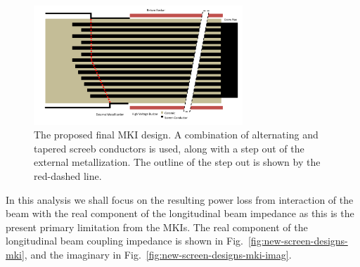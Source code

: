 \begin{figure}
\begin{center}
\includegraphics[width=0.7\textwidth]{LHC_MKI/figures/mki-design-layouts/mki-final-design.pdf}
\end{center}
\label{fig:24-final-design}
\caption{The proposed final MKI design. A combination of alternating and tapered screeb conductors is used, along with a step out of the external metallization. The outline of the step out is shown by the red-dashed line.}
\end{figure}

In this analysis we shall focus on the resulting power loss from interaction of the beam with the real component of the longitudinal beam impedance as this is the present primary limitation from the MKIs. The real component of the longitudinal beam coupling impedance is shown in Fig.~\ref{fig:new-screen-designs-mki}, and the imaginary in Fig.~\ref{fig:new-screen-designs-mki-imag}.

